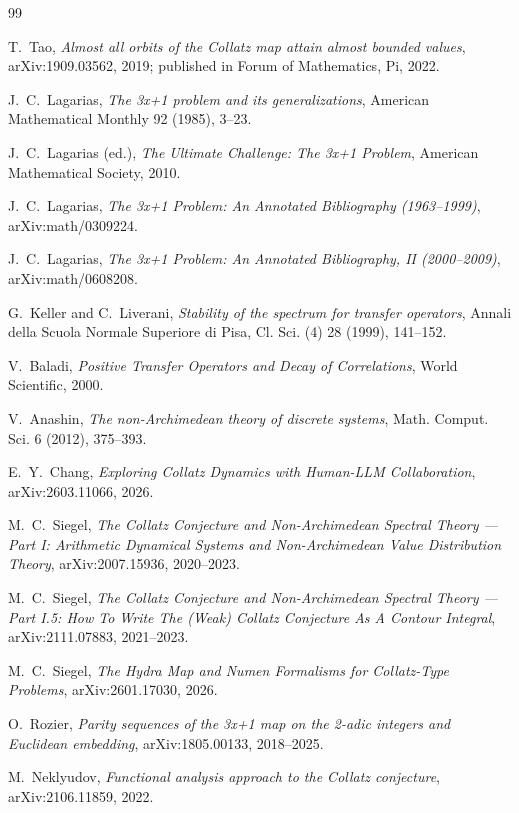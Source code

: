 \documentclass[11pt,a4paper]{article}
\theoremstyle{definition}
\begin{document}
\begin{thebibliography}{99}

T.~Tao,
\emph{Almost all orbits of the Collatz map attain almost bounded values},
arXiv:1909.03562, 2019; published in Forum of Mathematics, Pi, 2022.

J.~C.~Lagarias,
\emph{The 3x+1 problem and its generalizations},
American Mathematical Monthly 92 (1985), 3--23.

J.~C.~Lagarias (ed.),
\emph{The Ultimate Challenge: The 3x+1 Problem},
American Mathematical Society, 2010.

J.~C.~Lagarias,
\emph{The 3x+1 Problem: An Annotated Bibliography (1963--1999)},
arXiv:math/0309224.

J.~C.~Lagarias,
\emph{The 3x+1 Problem: An Annotated Bibliography, II (2000--2009)},
arXiv:math/0608208.

G.~Keller and C.~Liverani,
\emph{Stability of the spectrum for transfer operators},
Annali della Scuola Normale Superiore di Pisa, Cl. Sci. (4) 28 (1999), 141--152.

V.~Baladi,
\emph{Positive Transfer Operators and Decay of Correlations},
World Scientific, 2000.

V.~Anashin,
\emph{The non-Archimedean theory of discrete systems},
Math. Comput. Sci. 6 (2012), 375--393.

E.~Y.~Chang,
\emph{Exploring Collatz Dynamics with Human-LLM Collaboration},
arXiv:2603.11066, 2026.

M.~C.~Siegel,
\emph{The Collatz Conjecture and Non-Archimedean Spectral Theory --- Part I:
Arithmetic Dynamical Systems and Non-Archimedean Value Distribution Theory},
arXiv:2007.15936, 2020--2023.

M.~C.~Siegel,
\emph{The Collatz Conjecture and Non-Archimedean Spectral Theory --- Part I.5:
How To Write The (Weak) Collatz Conjecture As A Contour Integral},
arXiv:2111.07883, 2021--2023.

M.~C.~Siegel,
\emph{The Hydra Map and Numen Formalisms for Collatz-Type Problems},
arXiv:2601.17030, 2026.

O.~Rozier,
\emph{Parity sequences of the 3x+1 map on the 2-adic integers and Euclidean embedding},
arXiv:1805.00133, 2018--2025.

M.~Neklyudov,
\emph{Functional analysis approach to the Collatz conjecture},
arXiv:2106.11859, 2022.


\end{thebibliography}
\end{document}
